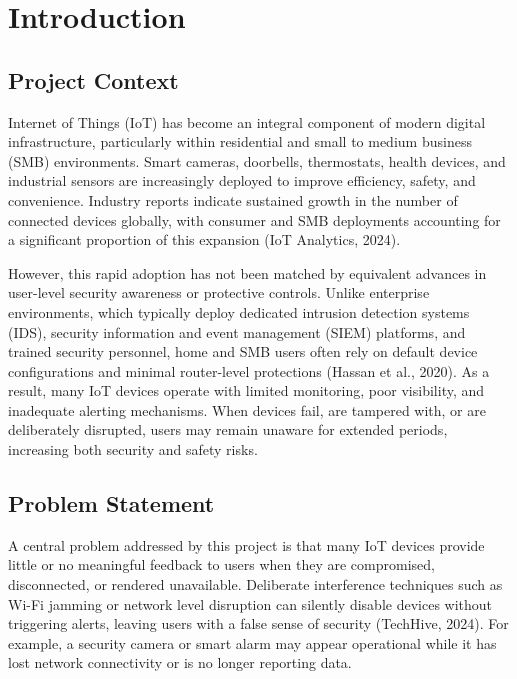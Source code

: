 \chapter{Introduction}
\label{ch:intro}

\section{Project Context}

Internet of Things (IoT) has become an integral component of modern digital infrastructure, particularly within residential and small to medium business (SMB) environments. Smart cameras, doorbells, thermostats, health devices, and industrial sensors are increasingly deployed to improve efficiency, safety, and convenience. Industry reports indicate sustained growth in the number of connected devices globally, with consumer and SMB deployments accounting for a significant proportion of this expansion (IoT Analytics, 2024).

However, this rapid adoption has not been matched by equivalent advances in user-level security awareness or protective controls. Unlike enterprise environments, which typically deploy dedicated intrusion detection systems (IDS), security information and event management (SIEM) platforms, and trained security personnel, home and SMB users often rely on default device configurations and minimal router-level protections (Hassan et al., 2020). As a result, many IoT devices operate with limited monitoring, poor visibility, and inadequate alerting mechanisms. When devices fail, are tampered with, or are deliberately disrupted, users may remain unaware for extended periods, increasing both security and safety risks.

\section{Problem Statement}

A central problem addressed by this project is that many IoT devices provide little or no meaningful feedback to users when they are compromised, disconnected, or rendered unavailable. Deliberate interference techniques such as Wi-Fi jamming or network level disruption can silently disable devices without triggering alerts, leaving users with a false sense of security (TechHive, 2024). For example, a security camera or smart alarm may appear operational while it has lost network connectivity or is no longer reporting data.

